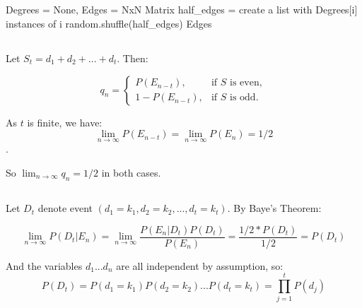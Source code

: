 \documentclass{article}
\begin{document}
\vspace{-2ex}
\subsection{} 
\vspace{-2ex}
\begin{algorithm}[H]
 Degrees = None, Edges = NxN Matrix\;
half\_edges = create a list with Degrees[i] instances of i\;
random.shuffle(half\_edges)\;
\Return Edges

\end{algorithm}

\subsection{}
\vspace{-2ex}
Let $S_t = d_1 + d_2 + ... + d_t$. Then:

$$q_n  = \begin{cases}
  P(E_{n-t}), & \text{if } S \text{ is even}, \\
  1 - P(E_{n-t}), & \text{if }  S \text{ is odd}.
\end{cases}$$

As $t$ is finite, we have:
$$\lim_{n\to\infty} P(E_{n-t}) = \lim_{n\to\infty} P(E_{n})  = 1/2$$. 

So $\lim_{n\to\infty} q_n = 1/2$ in both cases.

\subsection{}
\vspace{-2ex}
Let $D_t$ denote event $(d_1 = k_1, d_2 = k_2,..., d_t = k_t)$. By Baye's Theorem:

$$ \lim_{n\to\infty} P(D_t | E_n) = \lim_{n\to\infty} \frac{P(E_n | D_t)P(D_t)}{P(E_n)} = \frac{1/2* P(D_t)}{1/2} = P(D_t) $$

And the variables $d_1...d_n$ are all independent by assumption, so:
$$P(D_t) = P(d_1 = k_1) P(d_2 = k_2) ... P(d_t = k_t) = \prod_{j=1}^{t} P(d_j)$$ 

\section{}
\end{document}
